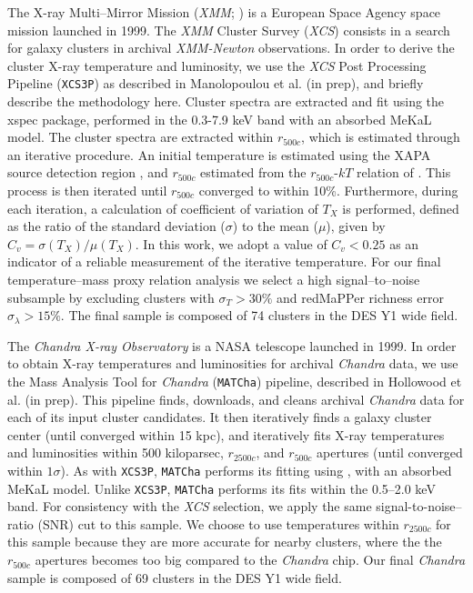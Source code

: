 The X-ray Multi--Mirror Mission (\emph{XMM}; \citealt{xmm}) is a European Space Agency space mission launched in 1999. The \emph{XMM} Cluster Survey (\emph{XCS}) consists in a search for galaxy clusters in archival \emph{XMM-Newton} observations. In order to derive the cluster X-ray temperature and luminosity, we use the \emph{XCS} Post Processing Pipeline ({\tt XCS3P}) as described in Manolopoulou et al. (in prep), and briefly describe the methodology here.  Cluster spectra are extracted and fit using the {\sc xspec} \citep{Arnaud96} package, performed in the 0.3-7.9 keV band with an absorbed MeKaL model.  %
The cluster spectra are extracted within $r_{500c}$, which is estimated through an iterative procedure.  An initial temperature is estimated using the XAPA source detection region \citep{LD11}, and $r_{500c}$ estimated from the $r_{500c}$-$kT$ relation of \cite{Arnaud2005}.  This process is then iterated until $r_{500c}$ converged to within 10\%.  Furthermore, during each iteration, a calculation of coefficient of variation \citep{Koopmans1964} of $T_{X}$ is performed, defined as the ratio of the standard deviation ($\sigma$) to the mean ($\mu$), given by $C_{v} = \sigma(T_{X})/\mu(T_{X})$.  In this work, we adopt a value of $C_{v}<0.25$ as an indicator of a reliable measurement of the iterative temperature. For our final temperature--mass proxy relation analysis we select a high signal--to--noise subsample by excluding clusters with $\sigma_T>30\%$ and redMaPPer richness error $\sigma_\lambda>15\%$. The final sample is composed of 74 clusters in the DES Y1 wide field.

The \emph{Chandra X-ray Observatory} is a NASA telescope launched in 1999. In order to obtain X-ray temperatures and luminosities for archival \emph{Chandra} data, we use the Mass Analysis Tool for \emph{Chandra} ({\tt MATCha}) pipeline, described in Hollowood et al. (in prep). This pipeline finds, downloads, and cleans archival \emph{Chandra} data for each of its input cluster candidates. It then iteratively finds a galaxy cluster center (until converged within 15 kpc), and iteratively fits X-ray temperatures and luminosities within 500 kiloparsec, $r_{2500c}$, and $r_{500c}$ apertures (until converged within $1\sigma{}$). As with {\tt XCS3P}, {\tt MATCha} performs its fitting using {}, with an absorbed MeKaL model. Unlike {\tt XCS3P}, {\tt MATCha} performs its fits within the 0.5--2.0 keV band. For consistency with the \emph{XCS} selection, we apply the same signal-to-noise--ratio (SNR) cut to this sample. We choose to use temperatures within $r_{2500c}$ for this sample because they are more accurate for nearby clusters, where the the $r_{500c}$ apertures becomes too big compared to the \emph{Chandra} chip. Our final \emph{Chandra} sample is composed of 69 clusters in the DES Y1 wide field.


